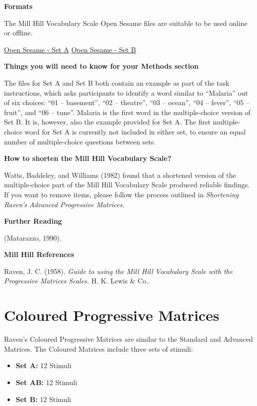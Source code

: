 \documentclass[
]{book}
\providecommand{\tightlist}{%
  \setlength{\itemsep}{0pt}\setlength{\parskip}{0pt}}
\begin{document}
\textbf{Formats}

The Mill Hill Vocabulary Scale Open Sesame files are suitable to be used online or offline.

\href{link\%20here}{Open Sesame - Set A} \textbar{} \href{link\%20here}{Open Sesame - Set B}

\textbf{Things you will need to know for your Methods section}

The files for Set A and Set B both contain an example as part of the task instructions, which asks participants to identify a word similar to ``Malaria'' out of six choices: ``01 -- basement'', ``02 -- theatre'', ``03 -- ocean'', ``04 -- fever'', ``05 -- fruit'', and ``06 -- tune''. Malaria is the first word in the multiple-choice version of Set B. It is, however, also the example provided for Set A. The first multiple-choice word for Set A is currently not included in either set, to ensure an equal number of multiple-choice questions between sets.

\textbf{How to shorten the Mill Hill Vocabulary Scale?}

Watts, Baddeley, and Williams (1982) found that a shortened version of the multiple-choice part of the Mill Hill Vocabulary Scale produced reliable findings. If you want to remove items, please follow the process outlined in \emph{Shortening Raven's Advanced Progressive Matrices.}

\textbf{Further Reading}

(Matarazzo, 1990).

\textbf{Mill Hill References}

Raven, J. C. (1958). \emph{Guide to using the Mill Hill Vocabulary Scale with the Progressive Matrices Scales.} H. K. Lewis \& Co..

\hypertarget{coloured-progressive-matrices}{%
\section{Coloured Progressive Matrices}\label{coloured-progressive-matrices}}

Raven's Coloured Progressive Matrices are similar to the Standard and Advanced Matrices. The Coloured Matrices include three sets of stimuli:

\begin{itemize}
\tightlist
\item
  \textbf{Set A:} 12 Stimuli
\item
  \textbf{Set AB:} 12 Stimuli
\item
  \textbf{Set B:} 12 Stimuli
\end{itemize}
\end{document}
